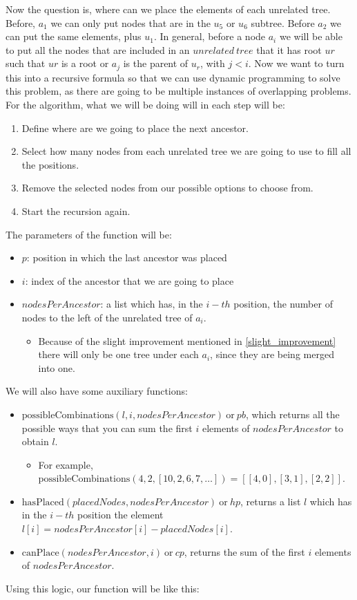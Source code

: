 Now the question is, where can we place the elements of each unrelated tree. Before, $a_1$ we can only put nodes that are in the $u_5$ or $u_6$ subtree. Before $a_2$ we can put the same elements, plus $u_1$. In general, before a node $a_i$ we will be able to put all the nodes that are included in an $unrelated \ tree$ that it has root $ur$ such that $ur$ is a root or $a_j$ is the parent of $u_r$, with $j<i$. Now we want to turn this into a recursive formula so that we can use dynamic programming to solve this problem, as there are going to be multiple instances of overlapping problems. \\
For the algorithm, what we will be doing will in each step will be:
\begin{enumerate}
    \item Define where are we going to place the next ancestor. 
    \item Select how many nodes from each unrelated tree we are going to use to fill all the positions.
    \item Remove the selected nodes from our possible options to choose from. 
    \item Start the recursion again. 
\end{enumerate}
The parameters of the function will be:
\begin{itemize}
    \item $p$: position in which the last ancestor was placed
    \item $i$: index of the ancestor that we are going to place
    \item $nodesPerAncestor$: a list which has, in the $i-th$ position, the number of nodes to the left of the unrelated tree of $a_i$.
        \begin{itemize}
            \item Because of the slight improvement mentioned in \ref{slight_improvement} there will only be one tree under each $a_i$, since they are being merged into one. 
         \end{itemize}
\end{itemize}
We will also have some auxiliary functions: 
\begin{itemize}
    \item $\mathrm{possibleCombinations}(l,i,nodesPerAncestor) \ \text{or} \ pb$, which returns all the possible ways that you can sum the first $i$ elements of $nodesPerAncestor$ to obtain $l$. 
        \begin{itemize}
            \item For example, $\mathrm{possibleCombinations}(4,2,[10,2,6,7, \dots])= [[4,0], [3,1], [2,2]]$. 
        \end{itemize}
    \item $\mathrm{hasPlaced}(placedNodes, nodesPerAncestor) \ \text{or} \ hp$, returns a list $l$ which has in the $i-th$ position the element $l[i]= nodesPerAncestor[i] - placedNodes[i]$.
    \item $\mathrm{canPlace}(nodesPerAncestor, i) \ \text{or} \ cp$, returns the sum of the first $i$ elements of $nodesPerAncestor$.
\end{itemize}
Using this logic, our function will be like this: 

